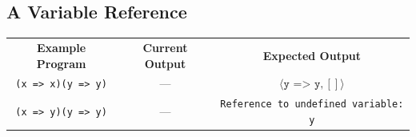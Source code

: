 \documentclass[12pt, oneside]{book}
\begin{document}
\subsection{A Variable Reference}

\begin{center}
\begin{tabular}{c|c|c}
\textbf{Example Program} & \textbf{Current Output} & \textbf{Expected Output} \\
\texttt{(x => x)(y => y)} & — & $\langle \texttt{y => y}, [] \rangle$ \\
\texttt{(x => y)(y => y)} & — & \texttt{Reference to undefined variable: y} \\
\end{tabular}
\end{center}




\backmatter




\end{document}
